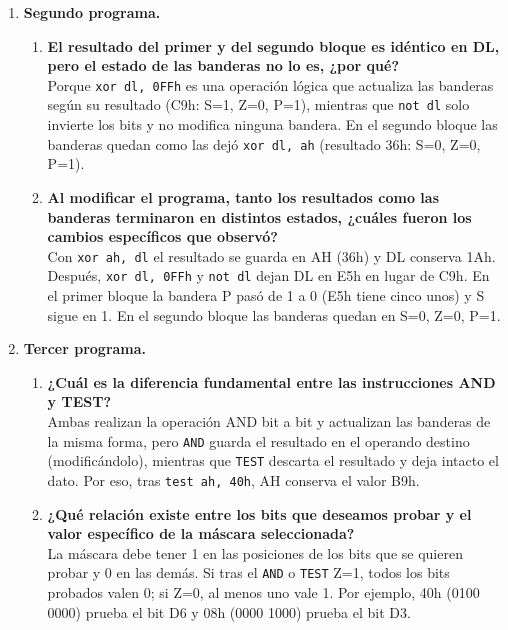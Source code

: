 \documentclass[10pt]{article}
\begin{document}
\begin{enumerate}
  \item \textbf{Segundo programa.}
  \begin{enumerate}
    \item \textbf{El resultado del primer y del segundo bloque es idéntico en DL, pero el estado de las banderas no lo es, ¿por qué?}\\
    Porque \texttt{xor dl, 0FFh} es una operación lógica que actualiza las banderas según su resultado (C9h: S=1, Z=0, P=1), mientras que \texttt{not dl} solo invierte los bits y no modifica ninguna bandera. En el segundo bloque las banderas quedan como las dejó \texttt{xor dl, ah} (resultado 36h: S=0, Z=0, P=1).
 
    \item \textbf{Al modificar el programa, tanto los resultados como las banderas terminaron en distintos estados, ¿cuáles fueron los cambios específicos que observó?}\\
    Con \texttt{xor ah, dl} el resultado se guarda en AH (36h) y DL conserva 1Ah. Después, \texttt{xor dl, 0FFh} y \texttt{not dl} dejan DL en E5h en lugar de C9h. En el primer bloque la bandera P pasó de 1 a 0 (E5h tiene cinco unos) y S sigue en 1. En el segundo bloque las banderas quedan en S=0, Z=0, P=1.
  \end{enumerate}
 
  \item \textbf{Tercer programa.}
  \begin{enumerate}
    \item \textbf{¿Cuál es la diferencia fundamental entre las instrucciones AND y TEST?}\\
    Ambas realizan la operación AND bit a bit y actualizan las banderas de la misma forma, pero \texttt{AND} guarda el resultado en el operando destino (modificándolo), mientras que \texttt{TEST} descarta el resultado y deja intacto el dato. Por eso, tras \texttt{test ah, 40h}, AH conserva el valor B9h.
 
    \item \textbf{¿Qué relación existe entre los bits que deseamos probar y el valor específico de la máscara seleccionada?}\\
    La máscara debe tener 1 en las posiciones de los bits que se quieren probar y 0 en las demás. Si tras el \texttt{AND} o \texttt{TEST} Z=1, todos los bits probados valen 0; si Z=0, al menos uno vale 1. Por ejemplo, 40h (0100 0000) prueba el bit D6 y 08h (0000 1000) prueba el bit D3.
  \end{enumerate}
\end{enumerate}
 
\end{document}
